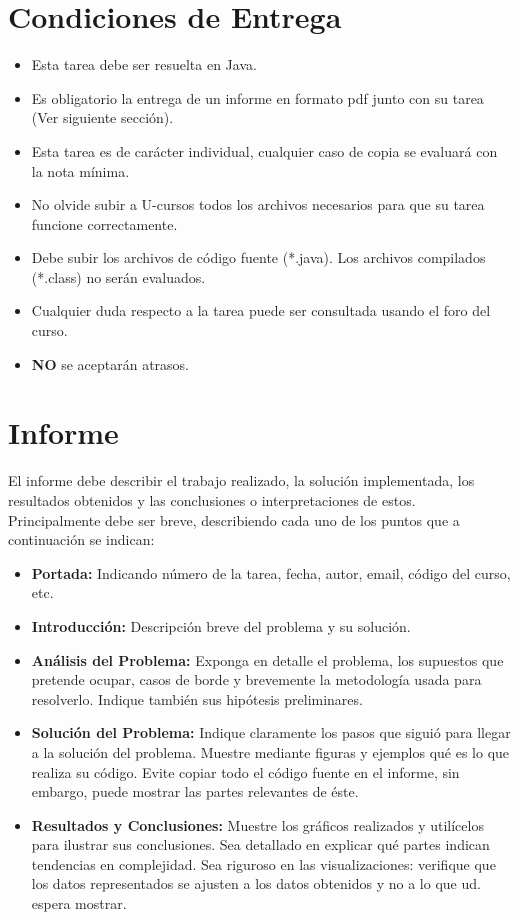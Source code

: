 \documentclass[dcc]{fcfmcourse}
\begin{document}
\section{Condiciones de Entrega}
\begin{itemize}
    \item Esta tarea debe ser resuelta en Java.
    \item Es obligatorio la entrega de un informe en formato pdf junto con su tarea (Ver siguiente sección).
    \item Esta tarea es de carácter individual, cualquier caso de copia se evaluará con la nota mínima.
    \item No olvide subir a U-cursos todos los archivos necesarios para que su tarea funcione correctamente.
    \item Debe subir los archivos de código fuente (*.java). Los archivos compilados (*.class) no serán evaluados.
    \item Cualquier duda respecto a la tarea puede ser consultada usando el foro del curso.
    \item \textbf{NO} se aceptarán atrasos.
\end{itemize}
\section{Informe}
El informe debe describir el trabajo realizado, la solución implementada, los resultados obtenidos y las conclusiones o interpretaciones de estos. Principalmente debe ser breve, describiendo cada uno de los puntos que a continuación se indican:
\begin{itemize}
\item \textbf{Portada:} Indicando número de la tarea, fecha, autor, email, código del curso, etc.
\item \textbf{Introducción:} Descripción breve del problema y su solución.
\item \textbf{Análisis del Problema:} Exponga en detalle el problema, los supuestos que pretende ocupar, casos de borde y brevemente la metodología usada para resolverlo. Indique también sus hipótesis preliminares.
\item \textbf{Solución del Problema:} Indique claramente los pasos que siguió para llegar a la solución del problema. Muestre mediante figuras y ejemplos qué es lo que realiza su código. Evite copiar todo el código fuente en el informe, sin embargo, puede mostrar las partes relevantes de éste.
\item \textbf{Resultados y Conclusiones:} Muestre los gráficos realizados y utilícelos para ilustrar sus conclusiones. Sea detallado en explicar qué partes indican tendencias en complejidad. Sea riguroso en las visualizaciones: verifique que los datos representados se ajusten a los datos obtenidos y no a lo que ud. espera mostrar.
\end{itemize}
\end{document}
